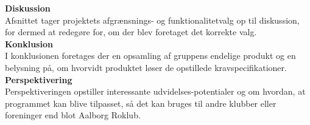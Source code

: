 \textbf{Diskussion}\\
Afsnittet tager projektets afgrænsnings- og funktionalitetvalg op til diskussion, for dermed at redegøre for, om der blev foretaget det korrekte valg. \\

\textbf{Konklusion}\\
I konklusionen foretages der en opsamling af gruppens endelige produkt og en belysning på, om hvorvidt produktet løser de opstillede kravspecifikationer. \\

\textbf{Perspektivering}\\
Perspektiveringen opstiller interessante udvidelses-potentialer og om hvordan, at programmet kan blive tilpasset, så det kan bruges til andre klubber eller foreninger end blot Aalborg Roklub.
